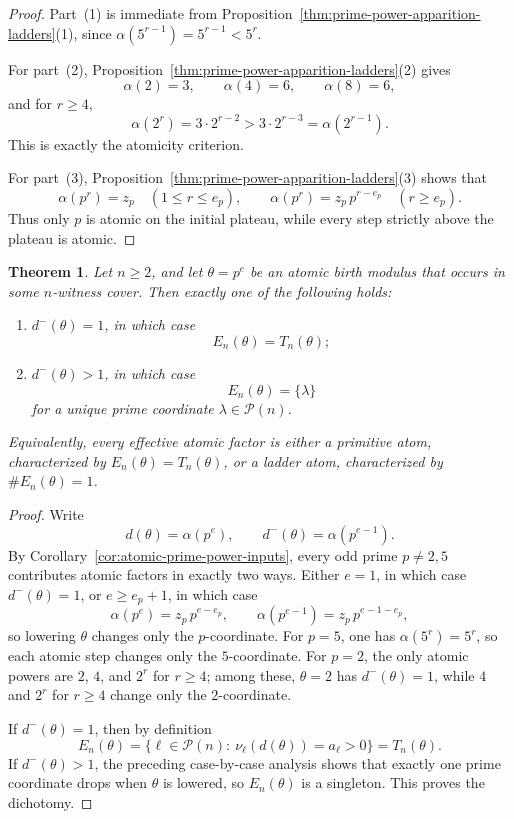 \documentclass[11pt,letterpaper]{article}
\numberwithin{equation}{section}
\theoremstyle{plain}
\newtheorem{theorem}{Theorem}[section]
\theoremstyle{definition}
\theoremstyle{remark}
\begin{document}
\begin{proof}
Part~(1) is immediate from Proposition~\ref{thm:prime-power-apparition-ladders}(1),
since $\alpha(5^{r-1})=5^{r-1}<5^r$.

For part~(2), Proposition~\ref{thm:prime-power-apparition-ladders}(2) gives
\[
\alpha(2)=3,\qquad \alpha(4)=6,\qquad \alpha(8)=6,
\]
and for $r\ge 4$,
\[
\alpha(2^r)=3\cdot 2^{r-2}>3\cdot 2^{r-3}=\alpha(2^{r-1}).
\]
This is exactly the atomicity criterion.

For part~(3), Proposition~\ref{thm:prime-power-apparition-ladders}(3) shows that
\[
\alpha(p^r)=z_p \quad (1\le r\le e_p),
\qquad
\alpha(p^r)=z_p\,p^{r-e_p}\quad (r\ge e_p).
\]
Thus only $p$ is atomic on the initial plateau, while every step strictly above
the plateau is atomic.
\end{proof}

\begin{theorem}
\label{thm:primitive-ladder-dichotomy}
Let $n\ge 2$, and let $\theta=p^e$ be an atomic birth modulus that occurs in
some $n$-witness cover. Then exactly one of the following holds:
\begin{enumerate}[label=(\arabic*)]
\item $d^{-}(\theta)=1$, in which case
\[
E_n(\theta)=T_n(\theta);
\]
\item $d^{-}(\theta)>1$, in which case
\[
E_n(\theta)=\{\lambda\}
\]
for a unique prime coordinate $\lambda\in\mathcal P(n)$.
\end{enumerate}
Equivalently, every effective atomic factor is either a \emph{primitive atom},
characterized by $E_n(\theta)=T_n(\theta)$, or a \emph{ladder atom},
characterized by $\#E_n(\theta)=1$.
\end{theorem}

\begin{proof}
Write
\[
d(\theta)=\alpha(p^e),
\qquad
d^{-}(\theta)=\alpha(p^{e-1}).
\]
By Corollary~\ref{cor:atomic-prime-power-inputs}, every odd prime
$p\neq 2,5$ contributes atomic factors in exactly two ways. Either $e=1$, in
which case $d^{-}(\theta)=1$, or $e\ge e_p+1$, in which case
\[
\alpha(p^e)=z_p\,p^{e-e_p},
\qquad
\alpha(p^{e-1})=z_p\,p^{e-1-e_p},
\]
so lowering $\theta$ changes only the $p$-coordinate. For $p=5$, one has
$\alpha(5^r)=5^r$, so each atomic step changes only the $5$-coordinate. For
$p=2$, the only atomic powers are $2$, $4$, and $2^r$ for $r\ge 4$; among
these, $\theta=2$ has $d^{-}(\theta)=1$, while $4$ and $2^r$ for $r\ge 4$
change only the $2$-coordinate.

If $d^{-}(\theta)=1$, then by definition
\[
E_n(\theta)=\{\ell\in\mathcal P(n):\ \nu_\ell(d(\theta))=a_\ell>0\}=T_n(\theta).
\]
If $d^{-}(\theta)>1$, the preceding case-by-case analysis shows that exactly
one prime coordinate drops when $\theta$ is lowered, so $E_n(\theta)$ is a
singleton. This proves the dichotomy.
\end{proof}
\end{document}
